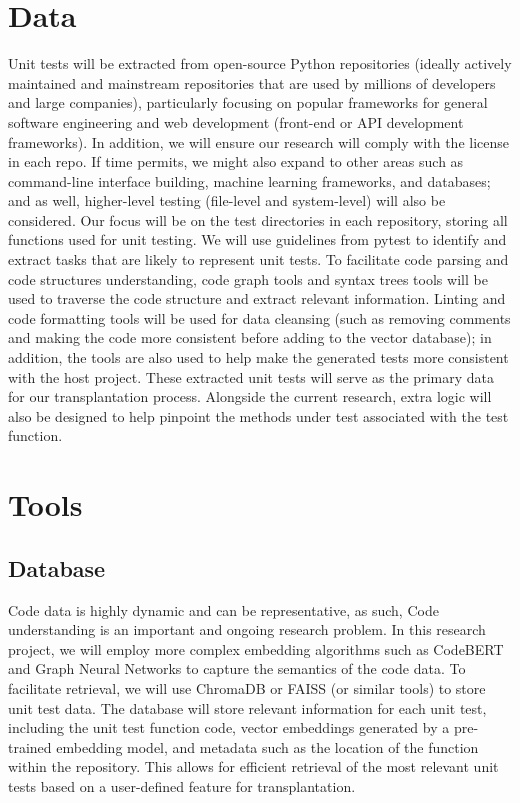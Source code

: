 \documentclass[sigconf]{acmart}
\begin{document}
\section{Data}
%
Unit tests will be extracted from open-source Python repositories (ideally actively maintained and mainstream repositories that are used by millions of developers and large companies), particularly focusing on popular frameworks for general software engineering and web development (front-end or API development frameworks).
%
In addition, we will ensure our research will comply with the license in each repo.
%
If time permits, we might also expand to other areas such as command-line interface building, machine learning frameworks, and databases; and as well, higher-level testing (file-level and system-level) will also be considered. 
%
Our focus will be on the test directories in each repository, storing all functions used for unit testing.
%
We will use guidelines from pytest to identify and extract tasks that are likely to represent unit tests.
%
To facilitate code parsing and code structures understanding, code graph tools and syntax trees tools will be used to traverse the code structure and extract relevant information.
%
Linting and code formatting tools will be used for data cleansing (such as removing comments and making the code more consistent before adding to the vector database); in addition, the tools are also used to help make the generated tests more consistent with the host project.
%
These extracted unit tests will serve as the primary data for our transplantation process.
%
Alongside the current research, extra logic will also be designed to help pinpoint the methods under test associated with the test function.





\section{Tools}
\subsection{Database}
Code data is highly dynamic and can be representative, as such, Code understanding is an important and ongoing research problem. In this research project, we will employ more complex embedding algorithms such as CodeBERT and Graph Neural Networks to capture the semantics of the code data. To facilitate retrieval, we will use ChromaDB or FAISS (or similar tools) to store unit test data. The database will store relevant information for each unit test, including the unit test function code, vector embeddings generated by a pre-trained embedding model, and metadata such as the location of the function within the repository. This allows for efficient retrieval of the most relevant unit tests based on a user-defined feature for transplantation.
\end{document}
